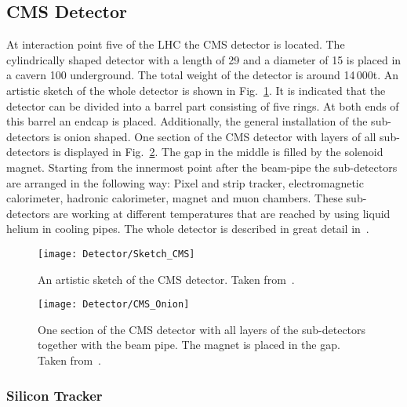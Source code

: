 \subsection{CMS Detector \label{LHCCMSCMSDet}}

At interaction point five of the LHC the CMS detector is located. The cylindrically shaped detector with a length of 29\m{} and a diameter of 15\m{} is placed in a cavern 100\m{} underground. The total weight of the detector is around 14\,000\unit{t}. An artistic sketch of the whole detector is shown in Fig.~\ref{plot:LHCCMSWholeCMS}. It is indicated that the detector can be divided into a barrel part consisting of five rings. At both ends of this barrel an endcap is placed. Additionally, the general installation of the sub-detectors is onion shaped. One section of the CMS detector with layers of all sub-detectors is displayed in Fig.~\ref{plot:LHCCMSOnionCMS}. The gap in the middle is filled by the solenoid magnet. Starting from the innermost point after the beam-pipe the sub-detectors are arranged in the following way: Pixel and strip tracker, electromagnetic calorimeter, hadronic calorimeter, magnet and muon chambers. These sub-detectors are working at different temperatures that are reached by using liquid helium in cooling pipes. The whole detector is described in great detail in~\cite{Chatrchyan:1129810}.

\begin{figure}[Htb]
  \centering
  \texttt{[image: Detector/Sketch\_CMS]}
  \caption[Artistic sketch of the CMS detector]{An artistic sketch of the CMS detector. Taken from~. \label{plot:LHCCMSWholeCMS}}
\end{figure}

\begin{figure}[Htb]
  \centering
  \texttt{[image: Detector/CMS\_Onion]}
  \caption[One section of the CMS detector with all layers]{One section of the CMS detector with all layers of the sub-detectors together with the beam pipe. The magnet is placed in the gap. Taken from~. \label{plot:LHCCMSOnionCMS}}
\end{figure}

\subsubsection{Silicon Tracker}

